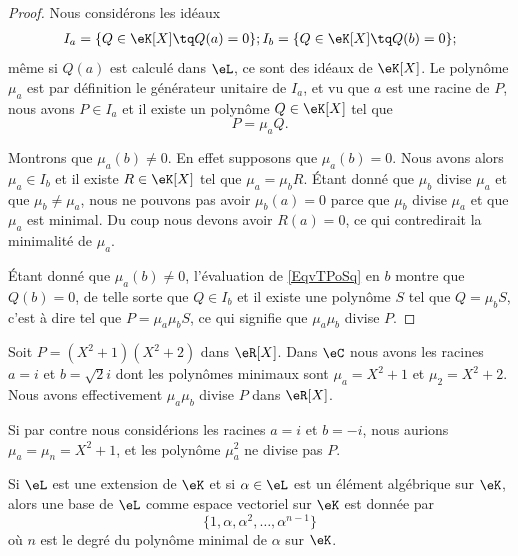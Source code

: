 \begin{proof}
    Nous considérons les idéaux
    \begin{subequations}
        \begin{align}
            I_a=\{ Q\in \eK[X]\tq Q(a)=0 \};
            I_b=\{ Q\in \eK[X]\tq Q(b)=0 \};
        \end{align}
    \end{subequations}
    même si \( Q(a)\) est calculé dans \( \eL\), ce sont des idéaux de \( \eK[X]\). Le polynôme \( \mu_a\) est par définition le générateur unitaire de \( I_a\), et vu que \( a\) est une racine de \( P\), nous avons \( P\in I_a\) et il existe un polynôme \( Q\in \eK[X]\) tel que 
    \begin{equation}    \label{EqvTPoSq}
        P=\mu_aQ.
    \end{equation}

    Montrons que \( \mu_a(b)\neq 0\). En effet supposons que \( \mu_a(b)=0\). Nous avons alors \( \mu_a\in I_b\) et il existe \( R\in \eK[X]\) tel que \( \mu_a=\mu_bR\). Étant donné que \( \mu_b\) divise \( \mu_a\) et que \( \mu_b\neq \mu_a\), nous ne pouvons pas avoir \( \mu_b(a)=0\) parce que \( \mu_b\) divise \( \mu_a\) et que \( \mu_a\) est minimal. Du coup nous devons avoir \( R(a)=0\), ce qui contredirait la minimalité de \( \mu_a\).

    Étant donné que \( \mu_a(b)\neq 0\), l'évaluation de \eqref{EqvTPoSq} en \( b\) montre que \( Q(b)=0\), de telle sorte que \( Q\in I_b\) et il existe une polynôme \( S\) tel que \( Q=\mu_bS\), c'est à dire tel que \( P=\mu_a\mu_bS\), ce qui signifie que \( \mu_a\mu_b\) divise \( P\).
\end{proof}

\begin{example}
    Soit \( P=(X^2+1)(X^2+2)\) dans \( \eR[X]\). Dans \( \eC\) nous avons les racines \( a=i\) et \( b=\sqrt{2}i\) dont les polynômes minimaux sont \( \mu_a=X^2+1\) et \( \mu_2=X^2+2\). Nous avons effectivement \( \mu_a\mu_b\) divise \( P\) dans \( \eR[X]\).

    Si par contre nous considérions les racines \( a=i\) et \( b=-i\), nous aurions \( \mu_a=\mu_n=X^2+1\), et les polynôme \( \mu_a^2\) ne divise pas \( P\).
\end{example}

\begin{proposition}     \label{PropdsRAsk}
    Si \( \eL\) est une extension de \( \eK\) et si \( \alpha\in \eL\) est un élément algébrique sur \( \eK\), alors une base de \( \eL\) comme espace vectoriel sur \( \eK\) est donnée par
    \begin{equation}
        \{ 1,\alpha,\alpha^2,\ldots, \alpha^{n-1} \}
    \end{equation}
    où \( n\) est le degré du polynôme minimal de \( \alpha\) sur \( \eK\).
\end{proposition}

